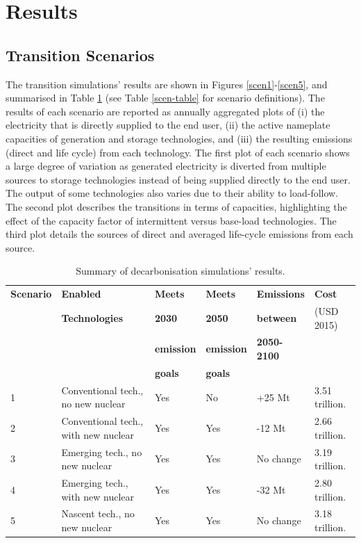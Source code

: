 \section{Results} \label{Results-and-discussion}

\subsection{Transition Scenarios}

The transition simulations' results are shown in Figures \ref{scen1}-\ref{scen5}, and summarised in Table \ref{tab:results_summary} (see Table \ref{scen-table} for scenario definitions). The results of each scenario are reported as annually aggregated plots of (i) the electricity that is directly supplied to the end user, (ii) the active nameplate capacities of generation and storage technologies, and (iii) the resulting emissions (direct and life cycle) from each technology. The first plot of each scenario shows a large degree of variation as generated electricity is diverted from multiple sources to storage technologies instead of being supplied directly to the end user. The output of some technologies also varies due to their ability to load-follow. The second plot describes the transitions in terms of capacities, highlighting the effect of the capacity factor of intermittent versus base-load technologies. The third plot details the sources of direct and averaged life-cycle emissions from each source.

\begin{table}[!ht]
	\caption{Summary of decarbonisation simulations' results.}
	\vspace{0.1in}
	\begin{tabularx}{0.9\textwidth}{p{} p{}p{}p{}p{}p{}}
		\hline
\textbf{Scenario} & \textbf{Enabled} & \textbf{Meets} & \textbf{Meets} & \textbf{Emissions} & \textbf{Cost} \\
 & \textbf{Technologies} & \textbf{2030} & \textbf{2050} & \textbf{between} & (USD 2015) \\
 &  & \textbf{emission} & \textbf{emission} & \textbf{2050-2100} &  \\
 &  & \textbf{goals} & \textbf{goals} & &  \\
\hline
1 & Conventional tech., no new nuclear & Yes & No & +25 Mt & 3.51 trillion. \\
2 & Conventional tech., with new nuclear & Yes & Yes & -12 Mt & 2.66 trillion. \\
3 & Emerging tech., no new nuclear & Yes & Yes & No change & 3.19 trillion. \\
4 & Emerging tech., with new nuclear & Yes & Yes & -32 Mt & 2.80 trillion. \\
5 & Nascent tech., no new nuclear & Yes & Yes & No change & 3.18 trillion. \\
\hline 
	\end{tabularx}
\label{tab:results_summary}
\end{table}

